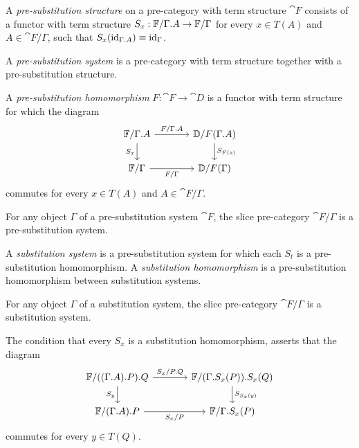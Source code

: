 \begin{defn}
A \emph{pre-substitution structure} on a pre-category with term structure $\cat{F}$ consists
of a functor with term structure $S_x:\cat{F}/\ctxext{\Gamma}{A}\to\cat{F}/\Gamma$ for every $x\in T(A)$ and
$A\in\cat{F}/\Gamma$, such that $S_x(\catid{\ctxext{\Gamma}{A}})\jdeq\catid{\Gamma}$.

A \emph{pre-substitution system} is a pre-category with term structure together with a
pre-substitution structure. 
\end{defn}

\begin{defn}
A \emph{pre-substitution homomorphism} $F:\cat{F}\to\cat{D}$ is a functor with term structure for
which the diagram
\begin{equation*}
\begin{tikzcd}[column sep=large]
\cat{F}/\ctxext{\Gamma}{A}
  \arrow[r,"F/\ctxext{\Gamma}{A}"]
  \arrow[d,swap,"S_x"]
  &
\cat{D}/F(\ctxext{\Gamma}{A})
  \arrow[d,"S_{F(x)}"]
  \\
\cat{F}/\Gamma
  \arrow[r,swap,"F/\Gamma"]
  &
\cat{D}/F(\Gamma)
\end{tikzcd}
\end{equation*}
commutes for every $x\in T(A)$ and $A\in\cat{F}/\Gamma$.
\end{defn}

\begin{lem}
For any object $\Gamma$ of a pre-substitution system $\cat{F}$, the slice pre-category
$\cat{F}/\Gamma	$ is a pre-substitution system.
\end{lem}

\begin{defn}
A \emph{substitution system} is a pre-substitution system for which each
$S_t$ is a pre-substitution homomorphism. A \emph{substitution homomorphism} is a
pre-substitution homomorphism between substitution systems.
\end{defn}

\begin{cor}
For any object $\Gamma$ of a substitution system, the slice pre-category $\cat{F}/\Gamma$
is a substitution system.
\end{cor}

\begin{rmk}
The condition that every $S_x$ is a substitution homomorphism, asserts that
the diagram
\begin{equation*}
\begin{tikzcd}[column sep=large]
\cat{F}/\ctxext{{{\Gamma}{A}}{P}}{Q}
  \arrow[r,"S_x/\ctxext{P}{Q}"]
  \arrow[d,swap,"S_y"]
  &
\cat{F}/\ctxext{{\Gamma}{S_x(P)}}{S_x(Q)}
  \arrow[d,"S_{S_x(y)}"]
  \\
\cat{F}/\ctxext{{\Gamma}{A}}{P}
  \arrow[r,swap,"S_x/P"]
  &
\cat{F}/\ctxext{\Gamma}{S_x(P)}
\end{tikzcd}
\end{equation*}
commutes for every $y\in T(Q)$.
\end{rmk}

